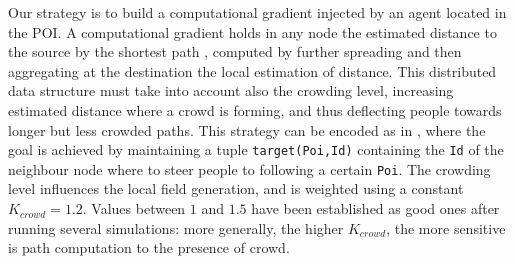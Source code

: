 \documentclass[12pt,a4paper,twoside,openright]{book}
\begin{document}
Our strategy is to build a computational gradient injected by an agent located in the POI.
%
A computational gradient holds in any node the estimated distance to the source by the shortest path \cite{proto}, computed by further spreading and then aggregating at the destination the local estimation of distance. This distributed data structure must take into account also the crowding level, increasing estimated distance where a crowd is forming, and thus deflecting people towards longer but less crowded paths.
%
This strategy can be encoded as in , where the goal is achieved by maintaining a tuple \texttt{target(Poi,Id)} containing the \texttt{Id} of the neighbour node where to steer people to following a certain \texttt{Poi}.
%
The crowding level influences the local field generation, and is weighted using a constant $K_{crowd}=1.2$.
%
Values between $1$ and $1.5$ have been established as good ones after running several simulations: more generally, the higher $K_{crowd}$, the more sensitive is path computation to the presence of crowd.
\end{document}
